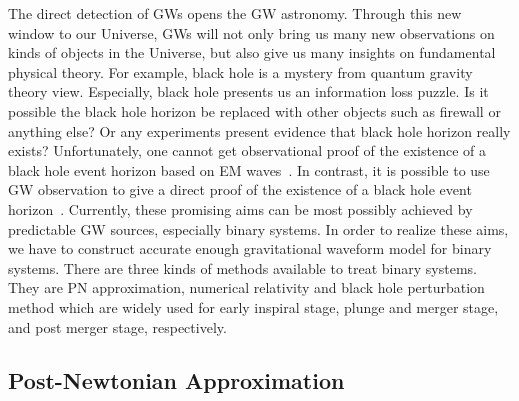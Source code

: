 \documentclass[a4paper,11pt]{article}
\begin{document}
The direct detection of GWs opens the GW astronomy. Through this new window to our Universe, GWs will not only bring us many new observations on kinds of objects in the Universe, but also give us many insights on fundamental physical theory. For example, black hole is a mystery from quantum gravity theory view. Especially, black hole presents us an information loss puzzle. Is it possible the black hole horizon be replaced with other objects such as firewall or anything else? Or any experiments present evidence that black hole horizon really exists? Unfortunately, one cannot get observational proof of the existence of a black hole event horizon based on EM waves~\cite{Abramowicz:2002vt}. In contrast, it is possible to use GW observation to give a direct proof of the existence of a black hole event horizon~\cite{Abedi:2016hgu}. Currently, these promising aims can be most possibly achieved by predictable GW sources, especially binary systems. In order to realize these aims, we have to construct accurate enough gravitational waveform model for binary systems. There are three kinds of methods available to treat binary systems. They are PN approximation, numerical relativity and black hole perturbation method which are widely used for early inspiral stage, plunge and merger stage, and post merger stage, respectively.

\subsection{Post-Newtonian Approximation}
\label{subsec:PN}
\end{document}
